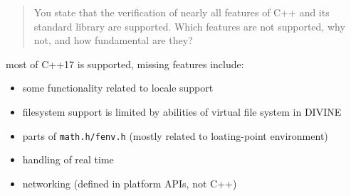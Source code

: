 \documentclass[aspectratio=169, fi]{paradise-slide}
\newcommand{\rquote}[1]{\begin{quote}#1\end{quote}\bigskip\setlength{\leftmargini}{1em}}
\begin{document}
\begin{frame}[noframenumbering]{\qtitle}
  \rquote{You state that the verification of nearly all features of C++ and its standard library are
    supported. Which features are not supported, why not, and how fundamental are they?}

  most of C++17 is supported, missing features include:
  \begin{itemize}
    \item some functionality related to locale support
      \pause

    \item filesystem support is limited by abilities of virtual file system in DIVINE
      \pause

    \item parts of \texttt{math.h/fenv.h} (mostly related to loating-point environment)
      \pause
    \item handling of real time
      \pause
    \item networking (defined in platform APIs, not C++)
  \end{itemize}
\end{frame}
\end{document}
